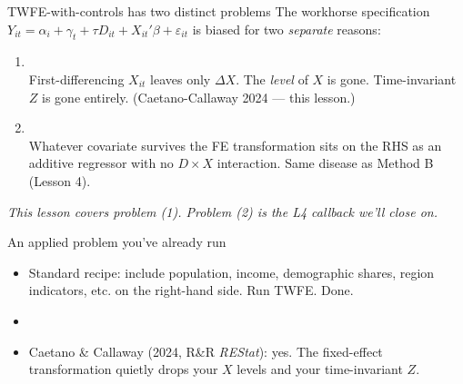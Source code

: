 \documentclass[aspectratio=169,11pt]{beamer}
\begin{document}
\begin{frame}{TWFE-with-controls has two distinct problems}
\vspace{0.4em}
The workhorse specification $Y_{it} = \alpha_i + \gamma_t + \tau D_{it} + X_{it}'\beta + \varepsilon_{it}$ is biased for two \textit{separate} reasons:
\vspace{0.5em}
\begin{enumerate}
  \item {} \\[0.2em]
  First-differencing $X_{it}$ leaves only $\Delta X$. The \textit{level} of $X$ is gone. Time-invariant $Z$ is gone entirely. \;\; (Caetano-Callaway 2024 --- this lesson.)
  \item {} \\[0.2em]
  Whatever covariate survives the FE transformation sits on the RHS as an additive regressor with no $D{\times}X$ interaction. Same disease as Method B (Lesson 4).
\end{enumerate}
\vspace{0.5em}
\begin{center}
\small\color{warmgray}\itshape
This lesson covers problem (1). Problem (2) is the L4 callback we'll close on.
\end{center}
\end{frame}

\begin{frame}{An applied problem you've already run}
\vspace{0.5em}
\vspace{0.5em}
\begin{itemize}
  \item Standard recipe: include population, income, demographic shares, region indicators, etc. on the right-hand side. Run TWFE. Done.
  \item {}
  \item Caetano \& Callaway (2024, R\&R \textit{REStat}): yes. The fixed-effect transformation quietly drops your $X$ levels and your time-invariant $Z$.
\end{itemize}
\end{frame}
\end{document}
